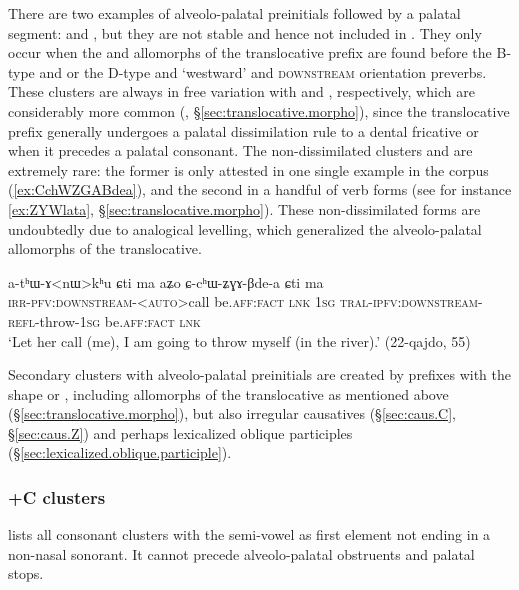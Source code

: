 There are two examples of alveolo-palatal preinitials followed by a palatal segment:  and , but they are not stable and hence not included in . They only occur when the  and  allomorphs of the translocative prefix are found before the B-type  and  or the D-type  and  `westward' and \textsc{downstream} orientation preverbs. These clusters are always in free variation with  and , respectively, which are considerably more common (, §\ref{sec:translocative.morpho}), since the translocative prefix generally undergoes a palatal dissimilation rule to a dental fricative  or  when it precedes a palatal consonant. The non-dissimilated clusters  and  are extremely rare: the former is only attested in one single example in the corpus (\ref{ex:CchWZGABdea}), and the second in a handful of verb forms (see for instance \ref{ex:ZYWlata}, §\ref{sec:translocative.morpho}). These non-dissimilated forms are undoubtedly due to analogical levelling, which generalized the alveolo-palatal allomorphs of the translocative.

\begin{exe}
	\ex \label{ex:CchWZGABdea}
	\gll a-tʰɯ-ɤ<nɯ>kʰu ɕti ma aʑo ɕ-cʰɯ-ʑɣɤ-βde-a ɕti ma \\
	\textsc{irr}-\textsc{pfv}:\textsc{downstream}-<\textsc{auto}>call be.\textsc{aff}:\textsc{fact} \textsc{lnk} \textsc{1sg} \textsc{tral}-\textsc{ipfv}:\textsc{downstream}-\textsc{refl}-throw-\textsc{1sg} be.\textsc{aff}:\textsc{fact} \textsc{lnk} \\
	\glt `Let her call (me), I am going to throw myself (in the river).' (22-qajdo, 55)
\end{exe}

Secondary clusters with alveolo-palatal preinitials are created by prefixes with the shape  or , including allomorphs of the translocative as mentioned above (§\ref{sec:translocative.morpho}), but also irregular causatives (§\ref{sec:caus.C}, §\ref{sec:caus.Z}) and perhaps lexicalized oblique participles (§\ref{sec:lexicalized.oblique.participle}).

\subsubsection{+C clusters}  \label{sec:jC.clusters}
  lists all consonant clusters with the semi-vowel  as first element not ending in a non-nasal sonorant. It cannot precede alveolo-palatal obstruents and palatal stops.

